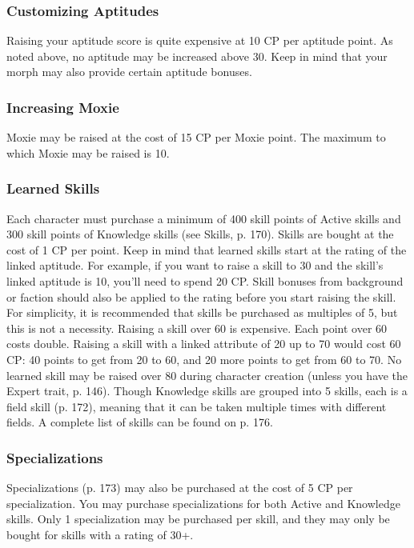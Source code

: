 \subsubsection{Customizing Aptitudes}
Raising your aptitude score is quite expensive at 10 CP per aptitude point. As
noted above, no aptitude may be increased above 30. Keep in mind that your
morph may also provide certain aptitude bonuses.

\subsubsection{Increasing Moxie} 
Moxie may be raised at the cost of 15 CP per Moxie point. The maximum to which
Moxie may be raised is 10.  %

\subsubsection{Learned Skills} 
Each character must purchase a minimum of 400 skill points of Active skills and
300 skill points of Knowledge skills (see Skills, p. 170). Skills are bought at
the cost of 1 CP per point. Keep in mind that learned skills start at the
rating of the linked aptitude. For example, if you want to raise a skill to 30
and the skill’s linked aptitude is 10, you’ll need to spend 20 CP.  Skill
bonuses from background or faction should also be applied to the rating before
you start raising the skill. For simplicity, it is recommended that skills be
purchased as multiples of 5, but this is not a necessity.  Raising a skill over
60 is expensive. Each point over 60 costs double. Raising a skill with a linked
attribute of 20 up to 70 would cost 60 CP: 40 points to get from 20 to 60, and
20 more points to get from 60 to 70.  No learned skill may be raised over 80
during character creation (unless you have the Expert trait, p. 146).  Though
Knowledge skills are grouped into 5 skills, each is a field skill (p. 172),
meaning that it can be taken multiple times with different fields.  A complete
list of skills can be found on p. 176.

\subsubsection{Specializations}
Specializations (p. 173) may also be purchased at the cost of 5 CP per
specialization. You may purchase specializations for both Active and Knowledge
skills.  Only 1 specialization may be purchased per skill, and they may only be
bought for skills with a rating of 30+.

